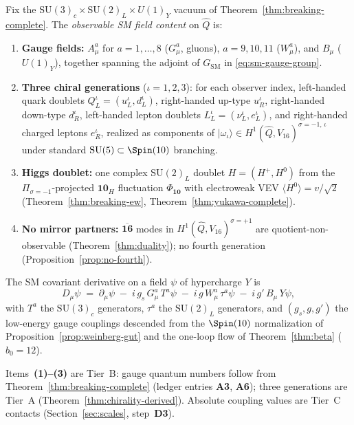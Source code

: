 \begin{definition}\label{def:sm-fields}
Fix the $\mathrm{SU}(3)_c\times\mathrm{SU}(2)_L\times U(1)_Y$ vacuum of
Theorem~\ref{thm:breaking-complete}. The \emph{observable SM field content}
on $\hat Q$ is:
\begin{enumerate}[label=\textbf{(\arabic*)},leftmargin=*]
  \item \textbf{Gauge fields:} $A_\mu^a$ for $a=1,\ldots,8$ ($G_\mu^a$, gluons),
    $a=9,10,11$ ($W_\mu^a$), and $B_\mu$ ($U(1)_Y$), together spanning the
    adjoint of $G_{\mathrm{SM}}$ in \eqref{eq:sm-gauge-group}.
  \item \textbf{Three chiral generations} ($\iota=1,2,3$): for each observer
    index, left-handed quark doublets $Q_L^\iota=(u_L^\iota,d_L^\iota)$,
    right-handed up-type $u_R^\iota$, right-handed down-type $d_R^\iota$,
    left-handed lepton doublets $L_L^\iota=(\nu_L^\iota,e_L^\iota)$, and
    right-handed charged leptons $e_R^\iota$, realized as components of
    $|\omega_\iota\rangle\in H^1(\hat Q,V_{16})^{\sigma=-1,\,\iota}$
    under standard $\mathrm{SU}(5)\subset\Spin(10)$ branching.
  \item \textbf{Higgs doublet:} one complex $\mathrm{SU}(2)_L$ doublet
    $H=(H^+,H^0)$ from the $\Pi_{\sigma=-1}$-projected $\mathbf{10}_H$
    fluctuation $\Phi_{\mathbf{10}}$ with electroweak VEV
    $\langle H^0\rangle=v/\sqrt{2}$ (Theorem~\ref{thm:breaking-ew},
    Theorem~\ref{thm:yukawa-complete}).
  \item \textbf{No mirror partners:} $\overline{\mathbf{16}}$ modes in
    $H^1(\hat Q,V_{16})^{\sigma=+1}$ are quotient-non-observable
    (Theorem~\ref{thm:duality}); no fourth generation
    (Proposition~\ref{prop:no-fourth}).
\end{enumerate}
The SM covariant derivative on a field $\psi$ of hypercharge $Y$ is
\begin{equation}\label{eq:sm-covariant}
  D_\mu\psi
  \;=\;
  \partial_\mu\psi
  \;-\;
  i\,g_s\,G_\mu^a\,T^a\psi
  \;-\;
  i\,g\,W_\mu^a\,\tau^a\psi
  \;-\;
  i\,g'\,B_\mu\,Y\psi,
\end{equation}
with $T^a$ the $\mathrm{SU}(3)_c$ generators, $\tau^a$ the $\mathrm{SU}(2)_L$
generators, and $(g_s,g,g')$ the low-energy gauge couplings descended from the
$\Spin(10)$ normalization of Proposition~\ref{prop:weinberg-gut} and the
one-loop flow of Theorem~\ref{thm:beta} ($b_0=12$).
\end{definition}

\begin{remark}
Items~\textbf{(1)--(3)} are Tier~B: gauge quantum numbers follow from
Theorem~\ref{thm:breaking-complete} (ledger entries \textbf{A3}, \textbf{A6});
three generations are Tier~A
(Theorem~\ref{thm:chirality-derived}). Absolute coupling values are Tier~C
contacts (Section~\ref{sec:scales}, step~\textbf{D3}).
\end{remark}

